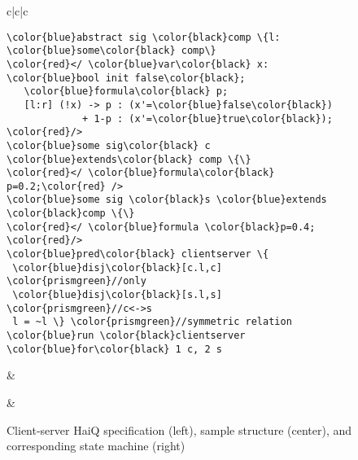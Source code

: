 \begin{figure*}
\setlength{\tabcolsep}{5pt}
\begin{tabular}{c|c|c}
\begin{minipage}{0.25\linewidth}
{\footnotesize
\begin{Verbatim}[commandchars=\\\{\},codes={\catcode`$=3\catcode`^=7\catcode`_=8}]
\color{blue}abstract sig \color{black}comp \{l: \color{blue}some\color{black} comp\}
\color{red}</ \color{blue}var\color{black} x: \color{blue}bool init false\color{black}; 
   \color{blue}formula\color{black} p;
   [l:r] (!x) -> p : (x'=\color{blue}false\color{black}) 
             + 1-p : (x'=\color{blue}true\color{black}); \color{red}/>
\color{blue}some sig\color{black} c \color{blue}extends\color{black} comp \{\}
\color{red}</ \color{blue}formula\color{black} p=0.2;\color{red} />
\color{blue}some sig \color{black}s \color{blue}extends \color{black}comp \{\}
\color{red}</ \color{blue}formula \color{black}p=0.4; \color{red}/>
\color{blue}pred\color{black} clientserver \{ 
 \color{blue}disj\color{black}[c.l,c] \color{prismgreen}//only
 \color{blue}disj\color{black}[s.l,s] \color{prismgreen}//c<->s
 l = ~l \} \color{prismgreen}//symmetric relation
\color{blue}run \color{black}clientserver \color{blue}for\color{black} 1 c, 2 s
\end{Verbatim}
}
\end{minipage}
&
\begin{minipage}{0.08\linewidth} 
\end{minipage}
&
\begin{minipage}{0.62\linewidth}

\end{minipage}
\end{tabular}

\caption{Client-server {\sf HaiQ} specification (left), sample structure (center), and corresponding state machine (right)}
\label{fig:intro2}
\end{figure*}